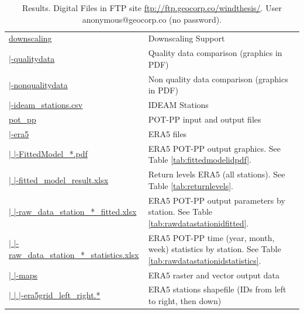 \documentclass[12pt,twoside]{reedthesis}
\begin{document}
\begingroup\fontsize{8}{10}\selectfont
\begin{longtable}[t]{>{\raggedright\arraybackslash}p{2.2in}>{\raggedright\arraybackslash}p{4in}}
\caption[Results. Digital Files]{\label{tab:resultsstructure}Results. Digital Files in FTP site \href{ftp://ftp.geocorp.co/windthesis/}{ftp://ftp.geocorp.co/windthesis/}. User anonymous@geocorp.co (no password).}\\
\toprule
\multicolumn{1}{l}{Folder Tree - Ftp Links} & \multicolumn{1}{l}{Description}\\
\midrule
\href{ftp://ftp.geocorp.co/windthesis/downscaling/}{downscaling} & Downscaling Support\\
\href{ftp://ftp.geocorp.co/windthesis/downscaling/qualitydata/}{  |-qualitydata} & Quality data comparison (graphics in PDF)\\
\href{ftp://ftp.geocorp.co/windthesis/downscaling/nonqualitydata/}{  |-nonqualitydata} & Non quality data comparison (graphics in PDF)\\
\href{ftp://ftp.geocorp.co/windthesis/downscaling/ideam_stations.csv}{  |-ideam\_stations.csv} & IDEAM Stations\\
\href{ftp://ftp.geocorp.co/windthesis/potpp/}{pot\_pp} & POT-PP input and output files\\
\href{ftp://ftp.geocorp.co/windthesis/potpp/era5/}{  |-era5} & ERA5 files\\
\href{ftp://ftp.geocorp.co/windthesis/potpp/era5/}{  |    |-FittedModel\_*.pdf} & ERA5 POT-PP output graphics. See Table \ref{tab:fittedmodelidpdf}.\\
\href{ftp://ftp.geocorp.co/windthesis/potpp/era5/fitted_model_result_PoissonProcessGumbelIntFunc.xlsx}{  |    |-fitted\_model\_result.xlsx} & Return levels ERA5 (all stations). See Table \ref{tab:returnlevels}.\\
\href{ftp://ftp.geocorp.co/windthesis/potpp/era5/}{  |    |-raw\_data\_station\_*\_fitted.xlsx} & ERA5 POT-PP output parameters by station. See Table \ref{tab:rawdatastationidfitted}.\\
\href{ftp://ftp.geocorp.co/windthesis/potpp/era5/}{  |    |-raw\_data\_station\_*\_statistics.xlsx} & ERA5 POT-PP time (year, month, week) statistics by station. See Table \ref{tab:rawdatastationidstatistics}.\\
\href{ftp://ftp.geocorp.co/windthesis/potpp/era5/maps/}{  |    |-maps} & ERA5 raster and vector output data\\
\href{ftp://ftp.geocorp.co/windthesis/potpp/era5/maps/}{  |    |    |-era5grid\_left\_right.*} & ERA5 stations shapefile (IDs from left to right, then down)\\

\end{longtable}
\end{document}

